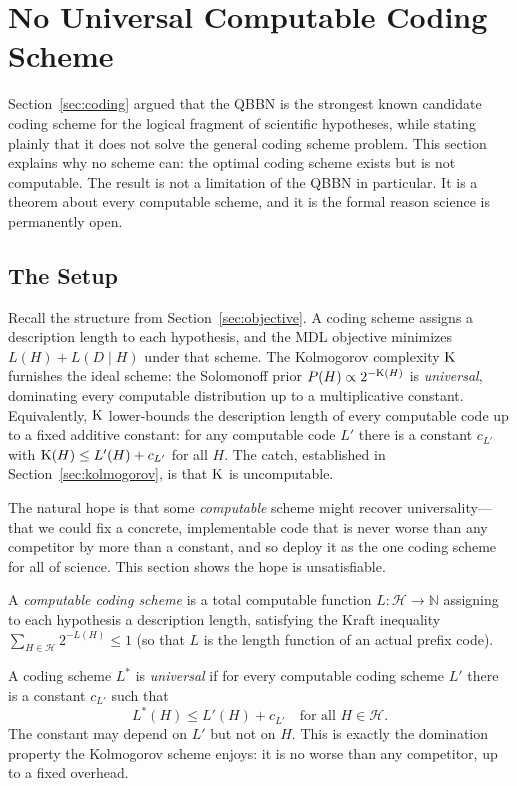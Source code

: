 \section{No Universal Computable Coding Scheme}
\label{sec:impossibility}

Section~\ref{sec:coding} argued that the QBBN is the strongest known candidate coding scheme for the logical fragment of scientific hypotheses, while stating plainly that it does not solve the general coding scheme problem. This section explains why no scheme can: the optimal coding scheme exists but is not computable. The result is not a limitation of the QBBN in particular. It is a theorem about every computable scheme, and it is the formal reason science is permanently open.

\subsection{The Setup}

Recall the structure from Section~\ref{sec:objective}. A coding scheme assigns a description length to each hypothesis, and the MDL objective minimizes $L(H) + L(D \mid H)$ under that scheme. The Kolmogorov complexity $\mathrm{K}$ furnishes the ideal scheme: the Solomonoff prior $P(H) \propto 2^{-\mathrm{K}(H)}$ is \emph{universal}, dominating every computable distribution up to a multiplicative constant. Equivalently, $\mathrm{K}$ lower-bounds the description length of every computable code up to a fixed additive constant: for any computable code $L'$ there is a constant $c_{L'}$ with $\mathrm{K}(H) \leq L'(H) + c_{L'}$ for all $H$. The catch, established in Section~\ref{sec:kolmogorov}, is that $\mathrm{K}$ is uncomputable.

The natural hope is that some \emph{computable} scheme might recover universality---that we could fix a concrete, implementable code that is never worse than any competitor by more than a constant, and so deploy it as the one coding scheme for all of science. This section shows the hope is unsatisfiable.

\begin{definition}
A \emph{computable coding scheme} is a total computable function $L : \mathcal{H} \to \mathbb{N}$ assigning to each hypothesis a description length, satisfying the Kraft inequality $\sum_{H \in \mathcal{H}} 2^{-L(H)} \leq 1$ (so that $L$ is the length function of an actual prefix code).
\end{definition}

\begin{definition}[Universality]
A coding scheme $L^{*}$ is \emph{universal} if for every computable coding scheme $L'$ there is a constant $c_{L'}$ such that
\[
  L^{*}(H) \leq L'(H) + c_{L'} \quad \text{for all } H \in \mathcal{H}.
\]
The constant may depend on $L'$ but not on $H$. This is exactly the domination property the Kolmogorov scheme enjoys: it is no worse than any competitor, up to a fixed overhead.
\end{definition}

